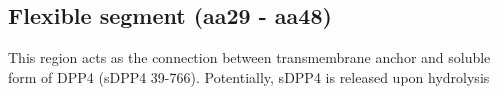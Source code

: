 \subsection{Flexible segment (aa29 - aa48)}

This region acts as the connection between transmembrane anchor and soluble form of DPP4 (sDPP4 39-766). Potentially, sDPP4 is released upon hydrolysis 
